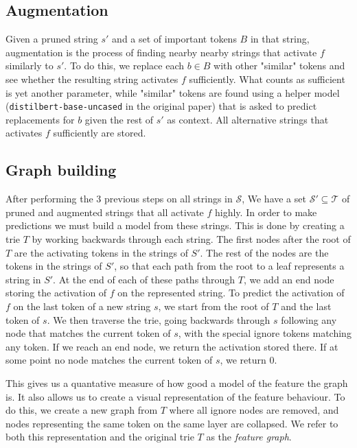 \documentclass[../main.tex]{subfiles}
\begin{document}
\subsection{Augmentation}
Given a pruned string $s'$ and a set of important tokens $B$ in that string, 
augmentation is the process of finding nearby nearby strings 
that activate $f$ similarly to $s'$.
To do this, we replace each $b\in B$ with other "similar" tokens and 
see whether the resulting string activates $f$ sufficiently.
What counts as sufficient is yet another parameter, 
while "similar" tokens are found using a helper model 
(\verb|distilbert-base-uncased| in the original paper) 
that is asked to predict replacements for $b$ 
given the rest of $s'$ as context.
All alternative strings that activates $f$ sufficiently are stored.

\subsection{Graph building}
After performing the $3$ previous steps on all strings in $\mathcal S$, 
We have a set $\mathcal S'\subseteq\mathcal T$ 
of pruned and augmented strings that all activate $f$ highly.
In order to make predictions we must build a model from these strings.
This is done by creating a trie $T$ 
by working backwards through each string.
The first nodes after the root of $T$ are the activating tokens 
in the strings of $S'$.
The rest of the nodes are the tokens in the strings of $S'$, 
so that each path from the root to a leaf represents a string in $S'$.
At the end of each of these paths through $T$, 
we add an end node storing the activation of $f$ on the represented string.
To predict the activation of $f$ on the last token of a new string $s$, 
we start from the root of $T$ and the last token of $s$.
We then traverse the trie, going backwards through $s$ 
following any node that matches the current token of $s$, 
with the special ignore tokens matching any token.
If we reach an end node, we return the activation stored there.
If at some point no node matches the current token of $s$, 
we return $0$.

This gives us a quantative measure of how good a model of the feature 
the graph is.
It also allows us to create a visual representation 
of the feature behaviour.
To do this, we create a new graph from $T$ 
where all ignore nodes are removed, 
and nodes representing the same token on the same layer are collapsed.
We refer to both this representation and the original trie $T$ 
as the \emph{feature graph}.


\end{document}

